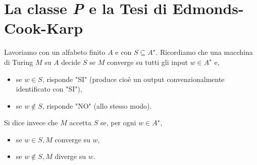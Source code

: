 \section{La classe \textit{P} e la Tesi di Edmonds-Cook-Karp}

Lavoriamo con un alfabeto finito $A$ e con $S \subseteq A^{\star}$. Ricordiamo
che una macchina di Turing $M$ su $A$ decide $S$ se $M$ converge su tutti gli
input $w \in A^{\star}$ e,

\begin{itemize}
    \item se $w \in S$, risponde "SI" (produce cioè un output convenzionalmente
          identificato con "SI"),
    \item se $w \notin S$, risponde "NO" (allo stesso modo).
\end{itemize}


Si dice invece che $M$ accetta $S$ se, per ogni $w \in A^{\star}$,

\begin{itemize}
    \item se $w \in S, M$ converge su $w$,
    \item se $w \notin S, M$ diverge su $w$.
\end{itemize}


